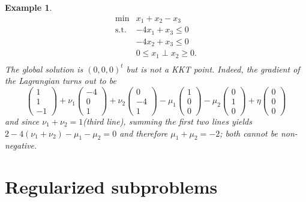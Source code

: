 \documentclass[12pt]{article}
\newtheorem{example}{Example}
\begin{document}
\begin{example}\label{ex:NoKKT}
\begin{equation}\label{MPCC_Mult1}
 \begin{array}{ll} 
      \min &x_1+x_2-x_3\\
      \textrm{s.t.} &-4x_1+x_3\le0\\
          &-4x_2+x_3\le0\\
          &0\leq x_1\perp x_2\geq0.\\
 \end{array}
\end{equation}
The global solution is $(0,0,0)^t$ but is not a KKT point. Indeed, the gradient of the Lagrangian turns out to be
\begin{equation}
\begin{pmatrix}1\\1\\-1\end{pmatrix} +
\nu_1\begin{pmatrix}-4\\0\\1\end{pmatrix} +
\nu_2\begin{pmatrix}0\\-4\\1\end{pmatrix} 
-\mu_1\begin{pmatrix}1\\0\\0\end{pmatrix} 
-\mu_2\begin{pmatrix}0\\1\\0\end{pmatrix} +
\eta\begin{pmatrix}0\\0\\0\end{pmatrix}
\end{equation}
and since $\nu_1+\nu_2=1$(third line), summing the first two lines yields $2-4(\nu_1+\nu_2)-\mu_1-\mu_2=0$ and therefore $\mu_1+\mu_2=-2$; both cannot be non-negative.
\end{example}


\section{Regularized subproblems}
\label{sec:RegSubProbs}
\end{document}
